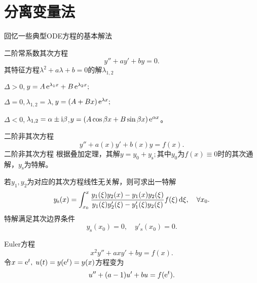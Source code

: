 \section{分离变量法}
回忆一些典型ODE方程的基本解法
\begin{method}{二阶常系数其次方程}{}
	\begin{equation}
		y''+ay'+by=0.
	\end{equation}
	其特征方程$\lambda^2+a\lambda+b=0$的解$\lambda_{1,2}$
	\begin{compactenum}[I.]
		\item $\Delta>0,$\quad$y=A\mathop{}\!\mathrm{e}^{\lambda_1x}+B\mathop{}\!\mathrm{e}^{\lambda_2x};$
		\item $\Delta=0,$\quad$\lambda_{1,2}=\lambda,$\quad$y=(A+Bx)\mathop{}\!\mathrm{e}^{\lambda x};$
		\item $\Delta<0,$\quad$\lambda_{1,2}=\alpha\pm\mathrm{i}\beta$,\quad$y=(A\cos\beta x+B\sin\beta x)\mathop{}\!\mathrm{e}^{\alpha x}$。
	\end{compactenum}
\end{method}
\begin{method}{二阶非其次方程}{}
	\begin{equation}
		y''+a(x)y'+b(x)y=f(x).
	\end{equation}
	二阶非其次方程
	根据叠加定理，其解$y=y_0+y_\mathrm s;$其中$y_0$为$f(x)\equiv 0$时的其次通解，$y_\mathrm s$为特解。
	
	若$y_1,y_2$为对应的其次方程线性无关解，则可求出一特解
	\begin{align}\label{General to Particular Solution}
		y_\mathrm s(x)=\int_{x_0}^x\frac{y_1(\xi)y_2(x)-y_1(x)y_2(\xi)}{y_1(\xi)y_2'(\xi)-y_1'(\xi)y_2(\xi)}f(\xi)\mathop{}\!\mathrm{d} \xi,\quad\forall x_0.
	\end{align}
	特解满足其次边界条件
	\[
		y_\mathrm s(x_0)=0,\quad y'_\mathrm s(x_0)=0.
	\]
\end{method}
\begin{method}{Euler方程}{}
	\begin{equation}
		x^2y''+axy'+by=f(x).
	\end{equation}
	令$x=\mathop{}\!\mathrm{e}^ t,\;u(t)=y(\mathop{}\!\mathrm{e}^ t)=y(x)$方程变为
	\begin{align}
		u''+(a-1)u'+bu=f(\mathop{}\!\mathrm{e}^ t).
	\end{align}
\end{method}
\clearpage
